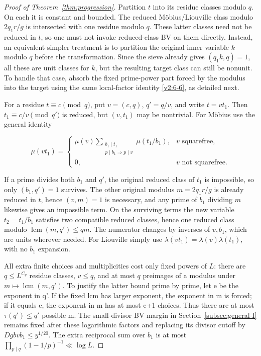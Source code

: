 \documentclass[11pt]{article}
\theoremstyle{definition}
\theoremstyle{remark}
\numberwithin{equation}{section}
\begin{document}
\begin{proof}[Proof of Theorem~\ref{thm:progression}]
Partition $t$ into its residue classes modulo $q$. On each it is constant and bounded. The reduced M\"obius/Liouville class modulo $2q_1r/g$ is intersected with one residue modulo $q$. These latter classes need not be reduced in $t$, so one must not invoke reduced-class BV on them directly. Instead, an equivalent simpler treatment is to partition the original inner variable $k$ modulo $q$ before the transformation. Since the sieve already gives $(q_1k,q)=1$, all these are unit classes for $k$, but the resulting target class can still be nonunit. To handle that case, absorb the fixed prime-power part forced by the modulus into the target using the same local-factor identity \eqref{v2:6-6}, as detailed next.

For a residue $t\equiv c\pmod q$, put $v=(c,q)$, $q'=q/v$, and write $t=v t_1$. Then $t_1\equiv c/v\pmod{q'}$ is reduced, but $(v,t_1)$ may be nontrivial. For M\"obius use the general identity


\begin{equation}\label{v2:14-2}
\mu(vt_1)=\begin{cases}
\mu(v)\displaystyle\sum_{\substack{b_1\mid t_1\\p\mid b_1\Rightarrow p\mid v}}\mu(t_1/b_1),&v\text{ squarefree},\\
0,&v\text{ not squarefree}.
\end{cases}
\end{equation}


If a prime divides both $b_1$ and $q'$, the original reduced class of $t_1$ is impossible, so only $(b_1,q')=1$ survives. The other original modulus $m=2q_1r/g$ is already reduced in $t$, hence $(v,m)=1$ is necessary, and any prime of $b_1$ dividing $m$ likewise gives an impossible term. On the surviving terms the new variable $t_2=t_1/b_1$ satisfies two compatible reduced classes, hence one reduced class modulo $\operatorname{lcm}(m,q')\le qm$. The numerator changes by inverses of $v,b_1$, which are units wherever needed. For Liouville simply use $\lambda(vt_1)=\lambda(v)\lambda(t_1)$, with no $b_1$ expansion.

All extra finite choices and multiplicities cost only fixed powers of $L$: there are $q\le L^{C_q}$ residue classes, $v\le q$, and at most $q$ preimages of a modulus under $m\mapsto\operatorname{lcm}(m,q')$. To justify the latter bound prime by prime, let e be the exponent in q'. If the fixed lcm has larger exponent, the exponent in m is forced; if it equals e, the exponent in m has at most e+1 choices. Thus there are at most $\tau(q')\le q'$ possible m. The small-divisor BV margin in Section~\ref{subsec:general-I} remains fixed after these logarithmic factors and replacing its divisor cutoff by $Dgbvb_1\le y^{1/20}$. The extra reciprocal sum over $b_1$ is at most $\prod_{p\mid q}(1-1/p)^{-1}\ll\log L$.


\end{proof}
\end{document}
